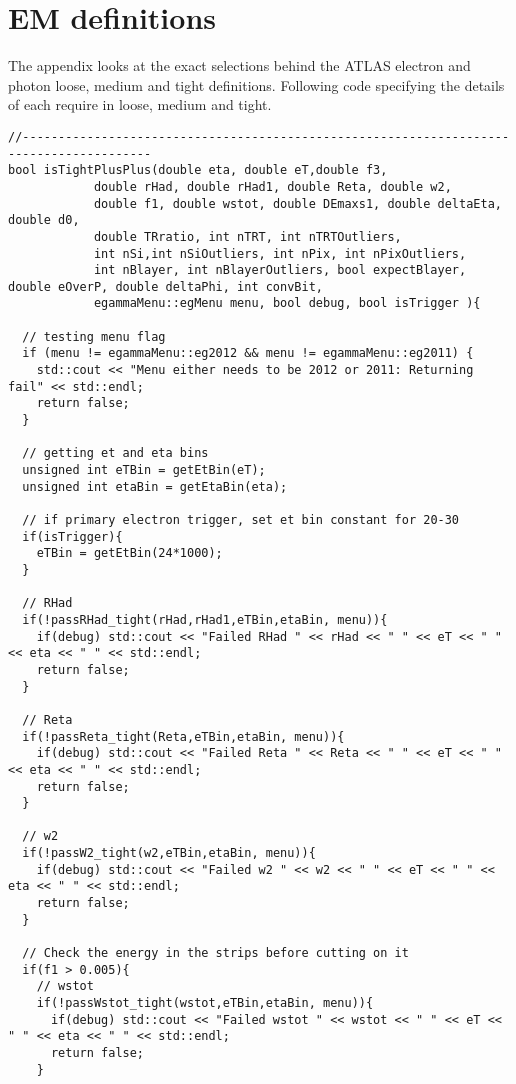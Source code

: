 \chapter{EM definitions}
  \label{ap:em}

The appendix looks at the exact selections behind the ATLAS electron and photon loose, medium and tight definitions. Following code specifying the details of each require in loose, medium and tight.



\begin{lstlisting}
//----------------------------------------------------------------------------------------
bool isTightPlusPlus(double eta, double eT,double f3,
			double rHad, double rHad1, double Reta, double w2, 
			double f1, double wstot, double DEmaxs1, double deltaEta, double d0,
			double TRratio, int nTRT, int nTRTOutliers,
			int nSi,int nSiOutliers, int nPix, int nPixOutliers, 
			int nBlayer, int nBlayerOutliers, bool expectBlayer, double eOverP, double deltaPhi, int convBit,
			egammaMenu::egMenu menu, bool debug, bool isTrigger ){
	
  // testing menu flag
  if (menu != egammaMenu::eg2012 && menu != egammaMenu::eg2011) {
    std::cout << "Menu either needs to be 2012 or 2011: Returning fail" << std::endl;
    return false; 
  }

  // getting et and eta bins  
  unsigned int eTBin = getEtBin(eT);
  unsigned int etaBin = getEtaBin(eta);

  // if primary electron trigger, set et bin constant for 20-30 
  if(isTrigger){
    eTBin = getEtBin(24*1000);
  }
  
  // RHad
  if(!passRHad_tight(rHad,rHad1,eTBin,etaBin, menu)){
    if(debug) std::cout << "Failed RHad " << rHad << " " << eT << " " << eta << " " << std::endl;
    return false;
  }

  // Reta 
  if(!passReta_tight(Reta,eTBin,etaBin, menu)){
    if(debug) std::cout << "Failed Reta " << Reta << " " << eT << " " << eta << " " << std::endl;
    return false;
  }

  // w2
  if(!passW2_tight(w2,eTBin,etaBin, menu)){
    if(debug) std::cout << "Failed w2 " << w2 << " " << eT << " " << eta << " " << std::endl;
    return false;
  }

  // Check the energy in the strips before cutting on it
  if(f1 > 0.005){
    // wstot
    if(!passWstot_tight(wstot,eTBin,etaBin, menu)){
      if(debug) std::cout << "Failed wstot " << wstot << " " << eT << " " << eta << " " << std::endl;
      return false;
    }
  

\end{lstlisting}
